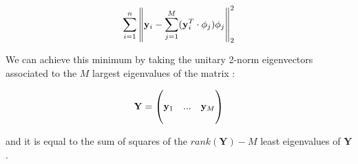 \documentclass[a4paper]{article}
\begin{document}
$$\sum_{i=1}^n\left\|\mathbf y_i-\sum_{j=1}^M(\mathbf y_i^T\cdot\phi_j)\phi_j\right\|^2_2$$

We can achieve this minimum by taking the unitary 2-norm eigenvectors associated to the $M$ largest eigenvalues of the matrix :

$$\mathbf Y=\left(\begin{matrix}&&\\\mathbf y_1&...&\mathbf y_M\\&&\end{matrix}\right)$$

\noindent and it is equal to the sum of squares of the $rank(\mathbf Y)-M$ least eigenvalues of $\mathbf Y$.
\end{document}
